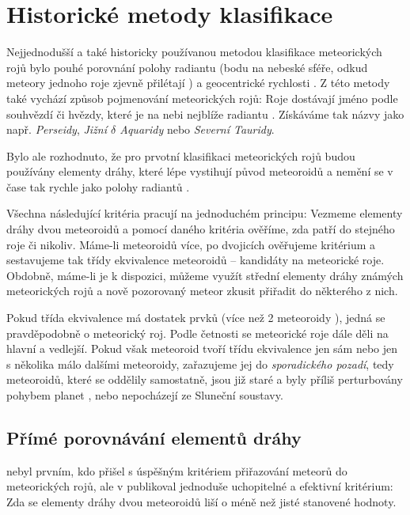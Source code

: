 \chapter{Historické metody klasifikace}%
Nejjednodušší a také historicky používanou metodou klasifikace meteorických rojů bylo pouhé porovnání polohy radiantu (bodu na nebeské sféře, odkud meteory jednoho roje zjevně přilétají \cite{glossary}) a geocentrické rychlosti \cite{radiosurvey}. Z této metody také vychází způsob pojmenování meteorických rojů: Roje dostávají jméno podle souhvězdí či hvězdy, které je na nebi nejblíže radiantu \cite{dsh}. Získáváme tak názvy jako např. \textit{Perseidy}, \textit{Jižní $\delta$ Aquaridy} nebo \textit{Severní Tauridy}.

Bylo ale rozhodnuto, že pro prvotní klasifikaci meteorických rojů budou používány elementy dráhy, které lépe vystihují původ meteoroidů a nemění se v čase tak rychle jako polohy radiantů \cite{radiosurvey}.

\medskip

Všechna následující kritéria pracují na jednoduchém principu: Vezmeme elementy dráhy dvou meteoroidů a pomocí daného kritéria ověříme, zda patří do stejného roje či nikoliv. Máme-li meteoroidů více, po dvojicích ověřujeme kritérium a sestavujeme tak třídy ekvivalence meteoroidů -- kandidáty na meteorické roje. Obdobně, máme-li je k dispozici, můžeme využít střední elementy dráhy známých meteorických rojů a nově pozorovaný meteor zkusit přiřadit do některého z nich.

Pokud třída ekvivalence má dostatek prvků (více než 2 meteoroidy \cite{radiosurvey}), jedná se pravděpodobně o meteorický roj. Podle četnosti se meteorické roje dále děli na hlavní a vedlejší. Pokud však meteoroid tvoří třídu ekvivalence jen sám nebo jen s několika málo dalšími meteoroidy, zařazujeme jej do \textit{sporadického pozadí}, tedy meteoroidů, které se oddělily samostatně, jsou již staré a byly příliš perturbovány pohybem planet \cite{dsh}, nebo nepocházejí ze Sluneční soustavy.

\section{Přímé porovnávání elementů dráhy}%
\citeauthor{radiosurvey} nebyl prvním, kdo přišel s úspěšným kritériem přiřazování meteorů do meteorických rojů, ale v \cite{radiosurvey} publikoval jednoduše uchopitelné a efektivní kritérium: Zda se elementy dráhy dvou meteoroidů liší o méně než jisté stanovené hodnoty.


